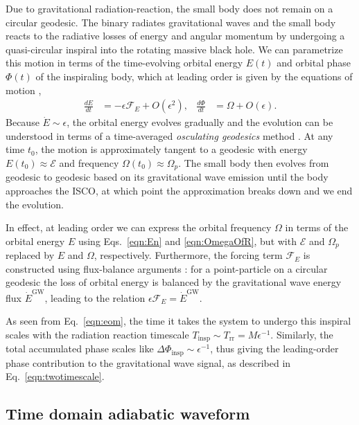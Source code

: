 \documentclass[%
 reprint,
 nofootinbib,
 amsmath,amssymb,
 aps,
 prd,
]{revtex4-2}
\begin{document}
Due to gravitational {radiation-reaction}, the small body does not remain on a circular geodesic. The binary {radiates} gravitational waves and the small body {reacts} to the radiative losses of energy and angular momentum by undergoing a quasi-circular inspiral into the rotating massive black hole. We can parametrize this motion in terms of the time-evolving orbital energy ${E}(t)$ and orbital phase $\Phi(t)$ of the inspiraling body, which at leading order is given by the equations of motion \cite{PounWard20,HughETC21},
\begin{align} \label{eqn:eom}
    \frac{d {E}}{dt} &= -\epsilon \mathcal{F}_E + O(\epsilon^2),
    &
    \frac{d\Phi}{dt} &= \Omega + O(\epsilon).
\end{align}
Because $\dot{E} \sim \epsilon$, the orbital energy evolves gradually and the evolution can be understood in terms of a time-averaged \emph{osculating geodesics} method \cite{GairETC11}. At any time $t_0$, the motion is approximately tangent to a geodesic with energy $E(t_0) \approx \mathcal{E}$ and frequency $\Omega(t_0) \approx \Omega_p$. The small body then evolves from geodesic to geodesic based on its gravitational wave emission until the body approaches the ISCO, at which point the approximation breaks down and we end the evolution.

In effect, at leading order we can express the orbital frequency $\Omega$ in terms of the orbital energy ${E}$ using Eqs.~\eqref{eqn:En} and \eqref{eqn:OmegaOfR}, but with $\mathcal{E}$ and $\Omega_p$ replaced by $E$ and $\Omega$, respectively. Furthermore, the forcing term $\mathcal{F}_E$ is constructed using flux-balance arguments \cite{Mino03, Galt82, QuinWald99}: for a point-particle on a circular geodesic the loss of orbital energy is balanced by the gravitational wave energy flux $\dot{E}^\mathrm{GW}$, leading to the relation $\epsilon \mathcal{F}_E = \dot{E}^\mathrm{GW}$. 

As seen from Eq.~\eqref{eqn:eom}, the time it takes the system to undergo this inspiral scales with the radiation reaction timescale $T_\mathrm{insp} \sim T_\mathrm{rr} = M \epsilon^{-1}$. Similarly, the total accumulated phase scales like $\Delta\Phi_\mathrm{insp} \sim \epsilon^{-1}$, thus giving the leading-order phase contribution to the gravitational wave signal, as described in Eq.~\eqref{eqn:twotimescale}.

\subsection{Time domain adiabatic waveform}
\label{sec:waveform}
\end{document}
